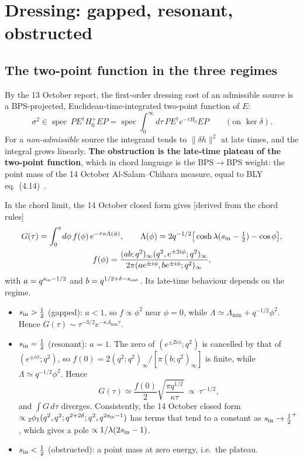 \documentclass[11pt]{article}
\newcommand{\tagbox}[2]{\textsf{\small\color{#1}[#2]}}
\newcommand{\CHORD}{\tagbox{cder}{derived from the chord rules}}
\theoremstyle{plain}
\theoremstyle{remark}
\numberwithin{equation}{section}
\begin{document}
\section{Dressing: gapped, resonant, obstructed}\label{sec:dressing}

\subsection{The two-point function in the three regimes}
By the 13 October report, the first-order dressing cost of an admissible source is a BPS-projected, Euclidean-time-integrated
two-point function of $E$:
\begin{equation}
\sigma^2\in\operatorname{spec}\,P E^\dagger H_0^{+}EP=\operatorname{spec}\int_0^\infty d\tau\,P E^\dagger e^{-\tau H_0}EP\qquad(\text{on }\ker\delta).
\end{equation}
For a \emph{non-admissible} source the integrand tends to $\|\delta h\|^2$ at late times, and the integral grows
linearly. \textbf{The obstruction is the late-time plateau of the two-point function}, which in chord language is the
BPS$\to$BPS weight: the point mass of the 14 October Al-Salam--Chihara measure, equal to BLY eq.~(4.14)~\cite{BLY}.

In the chord limit, the 14 October closed form gives \CHORD
\begin{gather}
G(\tau)=\int_0^\pi\! d\phi\,f(\phi)\,e^{-\tau\kappa\Lambda(\phi)},\qquad
\Lambda(\phi)=2q^{-1/2}\big[\cosh\lambda(s_{\rm in}-\tfrac12)-\cos\phi\big],\\
f(\phi)=\frac{(ab;q^2)_\infty(q^2,e^{\pm2i\phi};q^2)_\infty}{2\pi(ae^{\pm i\phi},be^{\pm i\phi};q^2)_\infty},
\end{gather}
with $a=q^{s_{\rm in}-1/2}$ and $b=q^{1/2+\delta-s_{\rm out}}$. Its late-time behaviour depends on the regime.
\begin{itemize}\itemsep1pt
\item $s_{\rm in}>\tfrac12$ (gapped): $a<1$, so $f\propto\phi^2$ near $\phi=0$, while $\Lambda\simeq\Lambda_{\min}+q^{-1/2}\phi^2$.
Hence $G(\tau)\sim\tau^{-3/2}e^{-\kappa\Lambda_{\min}\tau}$.
\item $s_{\rm in}=\tfrac12$ (resonant): $a=1$. The zero of $(e^{\pm2i\phi};q^2)$ is cancelled by that of
$(e^{\pm i\phi};q^2)$, so $f(0)=2(q^2;q^2)_\infty/[\pi(b;q^2)_\infty]$ is finite, while $\Lambda\simeq q^{-1/2}\phi^2$.
Hence
\begin{equation}
G(\tau)\simeq\frac{f(0)}2\sqrt{\frac{\pi q^{1/2}}{\kappa\tau}}\ \propto\ \tau^{-1/2},
\end{equation}
and $\int G\,d\tau$ diverges. Consistently, the 14 October closed form
$\propto{}_2\phi_1(q^2,q^2;q^{2+2\delta};q^2,q^{2s_{\rm in}-1})$ has terms that tend to a constant as $s_{\rm in}\to\tfrac12^+$,
which gives a pole $\propto1/\lambda(2s_{\rm in}-1)$.
\item $s_{\rm in}<\tfrac12$ (obstructed): a point mass at zero energy, i.e.\ the plateau.
\end{itemize}
\end{document}
